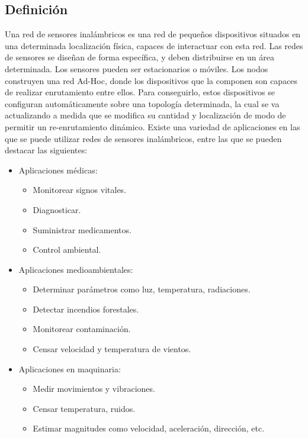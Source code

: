 \subsection{Definición}
Una red de sensores inalámbricos es una red de pequeños dispositivos situados en una determinada localización física, capaces de interactuar con esta red. Las redes de sensores se diseñan de forma específica, y deben distribuirse en un área determinada. Los sensores pueden ser estacionarios o móviles. Los nodos construyen una red Ad-Hoc, donde los dispositivos que la componen son capaces de realizar enrutamiento entre ellos. Para conseguirlo, estos dispositivos se configuran automáticamente sobre una topología determinada, la cual se va actualizando a medida que se modifica su cantidad y localización de modo de permitir un re-enrutamiento dinámico. Existe una variedad de aplicaciones en las que se puede utilizar redes de sensores inalámbricos, entre las que se pueden destacar las siguientes:

\begin{itemize}
    \item Aplicaciones médicas:
    \begin{itemize}
        \item Monitorear signos vitales.
        \item Diagnosticar.
        \item Suministrar medicamentos.
        \item Control ambiental.
        \end{itemize}
    \item Aplicaciones medioambientales:
    \begin{itemize}
        \item Determinar parámetros como luz, temperatura, radiaciones.
        \item Detectar incendios forestales.
        \item Monitorear contaminación.
        \item Censar velocidad y temperatura de vientos.
        \end{itemize}
        
        \newpage
    \item Aplicaciones en maquinaria:
    \begin{itemize}
        \item Medir movimientos y vibraciones.
        \item Censar temperatura, ruidos.
        \item Estimar magnitudes como velocidad, aceleración, dirección, etc.
        \end{itemize}
    \end{itemize}


